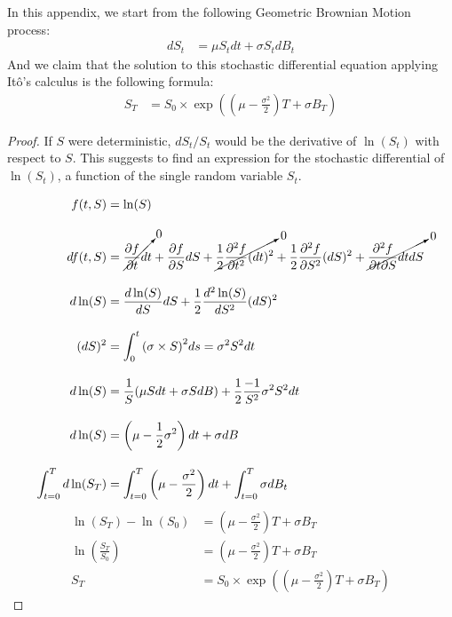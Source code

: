 \documentclass[12pt,twoside]{reedthesis}
\theoremstyle{definition}
\theoremstyle{definition}
\theoremstyle{remark}
\begin{document}
  In this appendix, we start from the following Geometric Brownian Motion
  process:
  \begin{align*}
  dS_t &= \mu S_t dt + \sigma S_t dB_t
  \end{align*}
  And we claim that the solution to this stochastic differential equation
  applying Itô's calculus is the following formula:
  \begin{align*}
  S_T &= S_0 \times \exp \left( \left( \mu  - \frac{\sigma^2}{2} \right) T  + \sigma B_T \right)
  \end{align*}
  \begin{proof}
  
  If $S$ were deterministic, $dS_t/S_t$ would be the derivative of $\ln(S_t)$ with respect to $S$. This suggests to find an expression for the stochastic differential of $\ln(S_t)$, a function of the single random variable $S_t$.
  
  
  \begin{align*} 
  f(t,S) &= \ln(S) \\[10pt]
  df(t,S) &= \cancelto{0}{\frac{\partial f}{\partial t}dt}  + \frac{\partial f}{\partial S} dS + \cancelto{0}{\frac{1}{2} \frac{\partial^2 f}{\partial t^2} (dt)^2} + \frac{1}{2} \frac{\partial^2 f}{\partial S^2} (dS)^2  + \cancelto{0}{\frac{\partial^2 f}{\partial t \partial S} dt dS} \\[10pt]
  d\ln(S) &= \frac{d\ln(S)}{dS} dS + \frac{1}{2} \frac{d^2\ln(S)}{dS^2}(dS)^2 \\[10pt]
  (dS)^2 &= \int_{0}^{t}{\left(\sigma \times S \right)^2} ds = \sigma^2 S^2 dt \\[10pt]
  d\ln(S) &= \frac{1}{S} (\mu S dt + \sigma S dB) + \frac{1}{2}\frac{-1}{S^2} \sigma^2 S^2 dt \\[10pt]
  d\ln(S) &= \left( \mu -  \frac{1}{2} \sigma^2 \right) dt + \sigma dB \\[10pt]
  \int_{t=0}^{T}{d\ln(S_T)} &= \int_{t=0}^{T}{\left( \mu - \frac{\sigma^2}{2} \right) dt} + \int_{t=0}^{T}{\sigma dB_t} 
  \end{align*}
  \begin{align*} 
  \ln(S_T) - \ln(S_0) &=  \left(\mu  - \frac{\sigma^2}{2} \right)  T + \sigma B_T \\[10pt]
  \ln \left( \frac{S_T}{S_0} \right) &= \left( \mu  - \frac{\sigma^2}{2}  \right) T + \sigma B_T \\[10pt]
  S_T &= S_0 \times \exp \left( \left( \mu  - \frac{\sigma^2}{2} \right) T  + \sigma B_T \right) 
  \end{align*}
  \end{proof}
\end{document}
